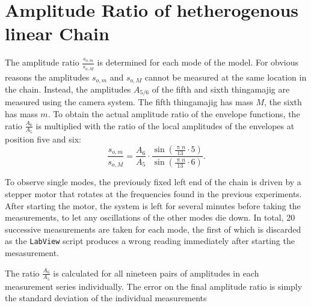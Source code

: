 \section{Amplitude Ratio of hetherogenous linear Chain}
The amplitude ratio $\frac{s_{o,m}}{s_{o,M}}$ is determined for each mode of the model.
For obvious reasons the amplitudes $s_{o,m}$ and $s_{o,M}$ cannot be measured at the same location in the chain.
Instead, the amplitudes $A_{5/6}$ of the fifth and sixth thingamajig are measured using the camera system.
The fifth thingamajig has mass $M$, the sixth has mass $m$.
To obtain the actual amplitude ratio of the envelope functions, the ratio $\frac{A_{6}}{A_{5}}$ is multiplied with the ratio of the local amplitudes of the envelopes at position five and six:
\begin{equation*}
	\frac{s_{o,m}}{s_{o,M}} = \frac{A_{6}}{A_{5}} \cdot \frac{\sin(\frac{\uppi n}{13} \cdot 5)}{\sin(\frac{\uppi n}{13} \cdot 6)}.
\end{equation*}

To observe single modes, the previously fixed left end of the chain is driven by a stepper motor that rotates at the frequencies found in the previous experiments.
After starting the motor, the system is left for several minutes before taking the measurements, to let any oscillations of the other modes die down.
In total, 20 successive measurements are taken for each mode, the first of which is discarded as the \texttt{LabView} script produces a wrong reading immediately after starting the mesasurement.

The ratio $\frac{A_{6}}{A_{5}}$ is calculated for all nineteen pairs of amplitudes in each measurement series individually.
The error on the final amplitude ratio is simply the standard deviation of the individual measurements 

